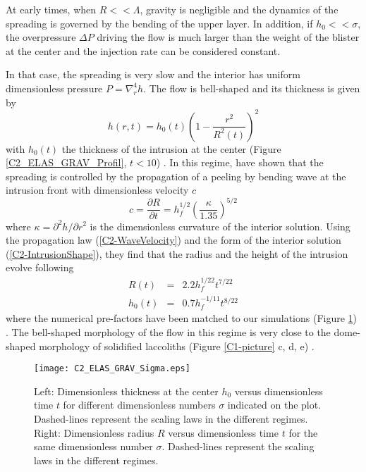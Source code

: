 At  early times,  when  $R<<\Lambda$, gravity  is  negligible and  the
dynamics of  the spreading  is governed  by the  bending of  the upper
layer.   In addition,  if $h_0<<\sigma$,  the overpressure  $\Delta P$
driving the flow is much larger than  the weight of the blister at the
center and the injection rate can be considered constant.

In that case, the spreading is  very slow and the interior has uniform
dimensionless pressure $P =\nabla_r^4h$.   The flow is bell-shaped and
its thickness is given by
\begin{equation}
  h(r,t) = h_0(t)\left(1-\frac{r^2}{R^2(t)}\right)^2
  \label{C2-IntrusionShape}
\end{equation}
with $h_0(t)$  the thickness  of the intrusion  at the  center (Figure
\ref{C2_ELAS_GRAV_Profil},                                     $t<10$)
\citep{Michaut:2011kg,Lister:2013ia}.       In       this      regime,
\citet{Lister:2013ia} have  shown that the spreading  is controlled by
the propagation  of a peeling by  bending wave at the  intrusion front
with dimensionless velocity $c$
\begin{equation}
  c=    \frac{\partial             R}{\partial            t}             =h_f^{1/2}
  \left(\frac{\kappa}{1.35}\right)^{5/2}
  \label{C2-WaveVelocity}
\end{equation}
where  $\kappa  =  \partial^2  h/\partial r^2$  is  the  dimensionless
curvature  of  the  interior  solution.   Using  the  propagation  law
(\ref{C2-WaveVelocity})  and   the  form  of  the   interior  solution
(\ref{C2-IntrusionShape}), they find that the radius and the height of
the intrusion evolve following
\begin{eqnarray}
  R(t) &=& 2.2h_f^{1/22}t^{7/22}\label{C2-ScalingR}\\
  h_0(t)&=&0.7 h_f^{-1/11}t^{8/22}\label{C2-ScalingH}
\end{eqnarray}
where the numerical  pre-factors have been matched  to our simulations
(Figure \ref{C2_ELAS_GRAV_Sigma}) . The  bell-shaped morphology of the
flow in  this regime is  very close  to the dome-shaped  morphology of
solidified    laccoliths   (Figure    \ref{C1-picture}   c,    d,   e)
\citep{Michaut:2011kg}.

\begin{figure}
  \begin{center}
    \graphicspath{ {/Users/thorey/Documents/These/Manuscript/Figure/Chapter2/} }
    \texttt{[image: C2\_ELAS\_GRAV\_Sigma.eps]}
    \caption{Left: Dimensionless thickness at  the center $h_0$ versus
      dimensionless  time  $t$  for  different  dimensionless  numbers
      $\sigma$  indicated on  the  plot.   Dashed-lines represent  the
      scaling  laws in  the different  regimes.  Right:  Dimensionless
      radius  $R$   versus  dimensionless   time  $t$  for   the  same
      dimensionless  number  $\sigma$.    Dashed-lines  represent  the
      scaling laws in the different regimes.}
    \label{C2_ELAS_GRAV_Sigma}
  \end{center}
\end{figure}

